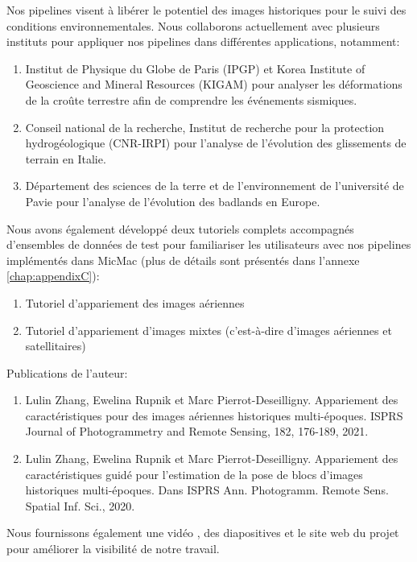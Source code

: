 \par
Nos pipelines visent à libérer le potentiel des images historiques pour le suivi des conditions environnementales. 
Nous collaborons actuellement avec plusieurs instituts pour appliquer nos pipelines dans différentes applications, notamment:\\
\begin{enumerate}
	\item Institut de Physique du Globe de Paris (IPGP) et Korea Institute of Geoscience and Mineral Resources (KIGAM) pour analyser les déformations de la croûte terrestre afin de comprendre les événements sismiques.
	\item Conseil national de la recherche, Institut de recherche pour la protection hydrogéologique (CNR-IRPI) pour l'analyse de l'évolution des glissements de terrain en Italie.
	\item Département des sciences de la terre et de l'environnement de l'université de Pavie pour l'analyse de l'évolution des badlands en Europe.
\end{enumerate}
\par
Nous avons également développé deux tutoriels complets accompagnés d'ensembles de données de test pour familiariser les utilisateurs avec nos pipelines implémentés dans MicMac\cite{HistoPcode} (plus de détails sont présentés dans l'annexe \ref{chap:appendixC}):\\
\begin{enumerate}
	\item Tutoriel d'appariement des images aériennes \cite{tuto-aerial} 
	\item Tutoriel d'appariement d'images mixtes (c'est-à-dire d'images aériennes et satellitaires) \cite{tuto-mixed} 
\end{enumerate}
\par
Publications de l'auteur:\\
\begin{enumerate}
	\item Lulin Zhang, Ewelina Rupnik et Marc Pierrot-Deseilligny. Appariement des caractéristiques pour des images aériennes historiques multi-époques. ISPRS Journal of Photogrammetry and Remote Sensing, 182, 176-189, 2021.
	\item Lulin Zhang, Ewelina Rupnik et Marc Pierrot-Deseilligny.	Appariement des caractéristiques guidé pour l'estimation de la pose de blocs d'images historiques multi-époques. Dans ISPRS Ann. Photogramm. Remote Sens. Spatial Inf. Sci., 2020.
\end{enumerate}
Nous fournissons également une vidéo \cite{HistoPVideo}, des diapositives \cite{HistoPSlides} et le site web du projet \cite{HistoPProj} pour améliorer la visibilité de notre travail.\\

